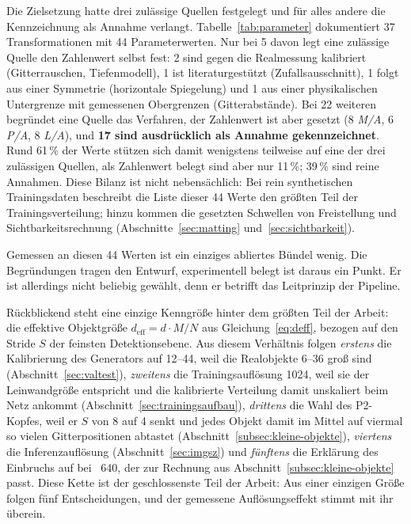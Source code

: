  Die Zielsetzung hatte drei zulässige Quellen
festgelegt und für alles andere die Kennzeichnung als Annahme verlangt.
Tabelle~\ref{tab:parameter} dokumentiert 37 Transformationen mit 44
Parameterwerten. Nur bei 5 davon legt eine zulässige Quelle den Zahlenwert
selbst fest: 2 sind gegen die Realmessung kalibriert (Gitterrauschen,
Tiefenmodell), 1 ist literaturgestützt (Zufallsausschnitt), 1 folgt aus einer
Symmetrie (horizontale Spiegelung) und 1 aus einer physikalischen Untergrenze
mit gemessenen Obergrenzen (Gitterabstände). Bei 22 weiteren begründet eine
Quelle das Verfahren, der Zahlenwert ist aber gesetzt (8 \emph{M/A}, 6
\emph{P/A}, 8 \emph{L/A}), und \textbf{17 sind ausdrücklich als Annahme
gekennzeichnet}. Rund 61\,\% der Werte stützen sich damit wenigstens teilweise
auf eine der drei zulässigen Quellen, als Zahlenwert belegt sind aber nur
11\,\%; 39\,\% sind reine Annahmen. Diese Bilanz ist nicht nebensächlich: Bei rein synthetischen Trainingsdaten
beschreibt die Liste dieser 44 Werte den größten Teil der Trainingsverteilung;
hinzu kommen die gesetzten Schwellen von Freistellung und Sichtbarkeitsrechnung
(Abschnitte~\ref{sec:matting} und~\ref{sec:sichtbarkeit}).

Gemessen an diesen 44 Werten ist ein einziges abliertes Bündel wenig. Die
Begründungen tragen den Entwurf, experimentell belegt ist daraus ein
Punkt. Er ist allerdings nicht beliebig gewählt, denn er betrifft das
Leitprinzip der Pipeline.

 Rückblickend steht eine
einzige Kenngröße hinter dem größten Teil der Arbeit: die effektive Objektgröße
$d_{\text{eff}} = d \cdot M/N$ aus Gleichung~\eqref{eq:deff}, bezogen auf den
Stride $S$ der feinsten Detektionsebene. Aus diesem Verhältnis folgen
\emph{erstens} die Kalibrierung des Generators auf 12--44\px, weil die
Realobjekte 6--36\px{} groß sind (Abschnitt~\ref{sec:valtest}),
\emph{zweitens} die Trainingsauflösung 1024, weil sie der Leinwandgröße
entspricht und die kalibrierte Verteilung damit unskaliert beim Netz ankommt
(Abschnitt~\ref{sec:trainingsaufbau}), \emph{drittens} die Wahl des P2-Kopfes,
weil er $S$ von 8 auf 4 senkt und jedes Objekt damit im Mittel auf viermal so
vielen Gitterpositionen abtastet (Abschnitt~\ref{subsec:kleine-objekte}),
\emph{viertens} die Inferenzauflösung (Abschnitt~\ref{sec:imgsz}) und
\emph{fünftens} die Erklärung des Einbruchs auf \mAPfifty{} \zswValNiedrig{}
bei ~640, der zur Rechnung aus Abschnitt~\ref{subsec:kleine-objekte}
passt. Diese Kette ist der geschlossenste Teil der Arbeit: Aus einer einzigen
Größe folgen fünf Entscheidungen, und der gemessene Auflösungseffekt stimmt mit
ihr überein.

